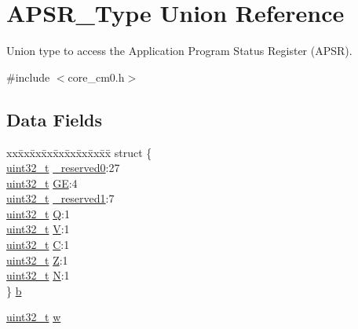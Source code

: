 \hypertarget{union_a_p_s_r___type}{\section{A\-P\-S\-R\-\_\-\-Type Union Reference}
\label{union_a_p_s_r___type}
}


Union type to access the Application Program Status Register (A\-P\-S\-R).  




{\ttfamily \#include $<$core\-\_\-cm0.\-h$>$}

\subsection*{Data Fields}
\begin{DoxyCompactItemize}
\item 
\begin{tabbing}
xx\=xx\=xx\=xx\=xx\=xx\=xx\=xx\=xx\=\kill
struct \{\\
\>\hyperlink{stdint_8h_a435d1572bf3f880d55459d9805097f62}{uint32\_t} \hyperlink{union_a_p_s_r___type_afbce95646fd514c10aa85ec0a33db728}{\_reserved0}:27\\
\>\hyperlink{stdint_8h_a435d1572bf3f880d55459d9805097f62}{uint32\_t} \hyperlink{union_a_p_s_r___type_adcb98a5b9c93b0cb69cdb7af5638f32e}{GE}:4\\
\>\hyperlink{stdint_8h_a435d1572bf3f880d55459d9805097f62}{uint32\_t} \hyperlink{union_a_p_s_r___type_ac681f266e20b3b3591b961e13633ae13}{\_reserved1}:7\\
\>\hyperlink{stdint_8h_a435d1572bf3f880d55459d9805097f62}{uint32\_t} \hyperlink{union_a_p_s_r___type_a22d10913489d24ab08bd83457daa88de}{Q}:1\\
\>\hyperlink{stdint_8h_a435d1572bf3f880d55459d9805097f62}{uint32\_t} \hyperlink{union_a_p_s_r___type_a8004d224aacb78ca37774c35f9156e7e}{V}:1\\
\>\hyperlink{stdint_8h_a435d1572bf3f880d55459d9805097f62}{uint32\_t} \hyperlink{union_a_p_s_r___type_a86e2c5b891ecef1ab55b1edac0da79a6}{C}:1\\
\>\hyperlink{stdint_8h_a435d1572bf3f880d55459d9805097f62}{uint32\_t} \hyperlink{union_a_p_s_r___type_a3b04d58738b66a28ff13f23d8b0ba7e5}{Z}:1\\
\>\hyperlink{stdint_8h_a435d1572bf3f880d55459d9805097f62}{uint32\_t} \hyperlink{union_a_p_s_r___type_a7e7bbba9b00b0bb3283dc07f1abe37e0}{N}:1\\
\} \hyperlink{union_a_p_s_r___type_a250681ece58cf12233f316edea344e75}{b}\\

\end{tabbing}\item 
\hyperlink{stdint_8h_a435d1572bf3f880d55459d9805097f62}{uint32\-\_\-t} \hyperlink{union_a_p_s_r___type_ae4c2ef8c9430d7b7bef5cbfbbaed3a94}{w}
\end{DoxyCompactItemize}


